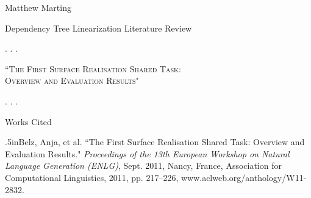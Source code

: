 \documentclass[12pt,letterpaper]{article}
\newenvironment{workscited}{
  \newcommand\entry{\noindent\hangindent .5in}
  \newpage
  \begin{center}
    Works Cited
  \end{center}
}{\newpage}
\begin{document}
\begin{flushleft}
  Matthew Marting\\
  {\centering Dependency Tree Linearization Literature Review\par}
  \setlength\parindent{.5in}
  . . .

  \noindent\textsc{``The First Surface Realisation Shared Task:\\
  Overview and Evaluation Results"}

  \noindent . . .
  \begin{workscited}
    \entry Belz, Anja, et al. ``The First Surface Realisation Shared Task: Overview and Evaluation Results." \textit{Proceedings of the 13th European Workshop on Natural Language Generation (ENLG)}, Sept. 2011, Nancy, France, Association for Computational Linguistics, 2011, pp. 217--226, www.aclweb.org/anthology/W11-2832.
  \end{workscited}
\end{flushleft}
\end{document}
